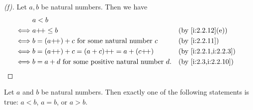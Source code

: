 \begin{proof}[(f)]
  Let \(a, b\) be natural numbers.
  Then we have
  \begin{align*}
         & a < b                                                                            \\
    \iff & a\pp \leq b                                            &  & \by{i:2.2.12}[e]     \\
    \iff & b = (a\pp) + c \text{ for some natural number } c      &  & \by{i:2.2.11}        \\
    \iff & b = (a\pp) + c = (a + c)\pp = a + (c\pp)               &  & \by{i:2.2.1,i:2.2.3} \\
    \iff & b = a + d \text{ for some positive natural number } d. &  & \by{i:2.3,i:2.2.10}
  \end{align*}
\end{proof}

\begin{prop}\label{i:2.2.13}
  Let \(a\) and \(b\) be natural numbers.
  Then exactly one of the following statements is true: \(a < b\), \(a = b\), or \(a > b\).
\end{prop}

